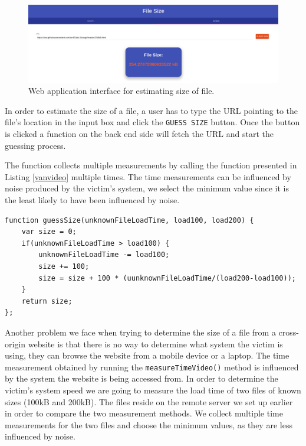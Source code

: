 \documentclass[10pt,a4paper,twoside]{book}
\begin{document}
\begin{figure}[h]
\centering
\includegraphics[width=\textwidth]{figures/guess.png}
\caption{Web application interface for estimating size of file.}
\label{fig:videoguess}
\end{figure}

In order to estimate the size of a file, a user has to type the URL pointing to the file's location in the input box and click the \texttt{GUESS SIZE} button. Once the button is clicked a function on the back end side will fetch the URL and start the guessing process.

The function collects multiple measurements by calling the function presented in Listing \ref{vanvideo} multiple times. The time measurements can be influenced by noise produced by the victim's system, we select the minimum value since it is the least likely to have been influenced by noise. 

\begin{lstlisting}[caption={JavaScript code for estimating the size of a cross-origin file.},label={filesizevideo}]
function guessSize(unknownFileLoadTime, load100, load200) {
	var size = 0;
	if(unknownFileLoadTime > load100) {
		unknownFileLoadTime -= load100;
		size += 100;
		size = size + 100 * (uunknownFileLoadTime/(load200-load100));
	}
	return size;
};
\end{lstlisting}

Another problem we face when trying to determine the size of a file from a cross-origin website is that there is no way to determine what system the victim is using, they can browse the website from a mobile device or a laptop. The time measurement obtained by running the \texttt{measureTimeVideo()} method is influenced by the system the website is being accessed from. In order to determine the victim's system speed we are going to measure the load time of two files of known sizes (100kB and 200kB). The files reside on the remote server we set up earlier in order to compare the two measurement methods. We collect multiple time measurements for the two files and choose the minimum values, as they are less influenced by noise.
\end{document}
